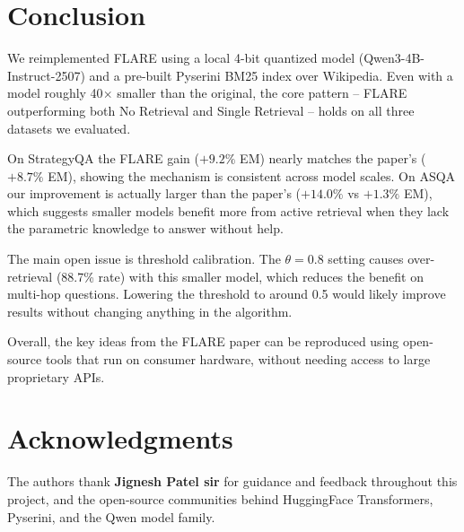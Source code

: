 \documentclass[conference]{IEEEtran}
\begin{document}
\section{Conclusion}
\label{sec:conclusion}

We reimplemented FLARE using a local 4-bit quantized model
(Qwen3-4B-Instruct-2507) and a pre-built Pyserini BM25 index over
Wikipedia. Even with a model roughly 40$\times$ smaller than the
original, the core pattern -- FLARE outperforming both No Retrieval
and Single Retrieval -- holds on all three datasets we evaluated.

On StrategyQA the FLARE gain ($+9.2\%$ EM) nearly matches the paper's
($+8.7\%$ EM), showing the mechanism is consistent across model
scales. On ASQA our improvement is actually larger than the paper's
($+14.0\%$ vs $+1.3\%$ EM), which suggests smaller models benefit
more from active retrieval when they lack the parametric knowledge to
answer without help.

The main open issue is threshold calibration. The $\theta = 0.8$
setting causes over-retrieval (88.7\% rate) with this smaller model,
which reduces the benefit on multi-hop questions. Lowering the
threshold to around 0.5 would likely improve results without changing
anything in the algorithm.

Overall, the key ideas from the FLARE paper can be reproduced using
open-source tools that run on consumer hardware, without needing
access to large proprietary APIs.

\section*{Acknowledgments}

The authors thank \textbf{Jignesh Patel sir} for guidance and feedback
throughout this project, and the open-source communities behind
HuggingFace Transformers, Pyserini, and the Qwen model family.
\end{document}
